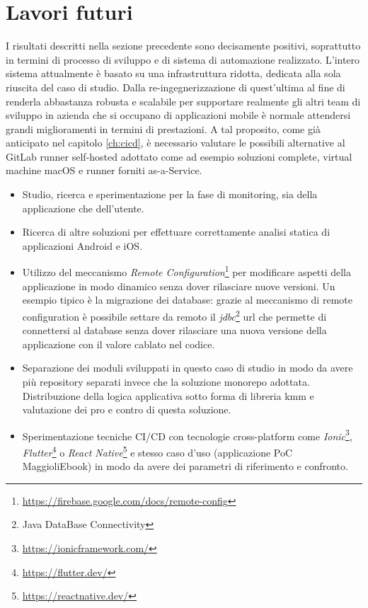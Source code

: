 \section{Lavori futuri}
I risultati descritti nella sezione precedente sono decisamente positivi, soprattutto in termini di processo di sviluppo e di sistema di automazione realizzato. L'intero sistema attualmente è basato su una infrastruttura ridotta, dedicata alla sola riuscita del caso di studio. Dalla re-ingegnerizzazione di quest'ultima al fine di renderla abbastanza robusta e scalabile per supportare realmente gli altri team di sviluppo in azienda che si occupano di applicazioni mobile è normale attendersi grandi miglioramenti in termini di prestazioni. A tal proposito, come già anticipato nel capitolo \ref{ch:cicd}, è necessario valutare le possibili alternative al GitLab runner self-hosted adottato come ad esempio soluzioni complete, virtual machine macOS e runner forniti as-a-Service.



\begin{itemize}
        \item Studio, ricerca e sperimentazione per la fase di monitoring, sia della applicazione che dell'utente.
        \item Ricerca di altre soluzioni per effettuare correttamente analisi statica di applicazioni Android e iOS.
        \item Utilizzo del meccanismo \textit{Remote Configuration}\footnote{\url{https://firebase.google.com/docs/remote-config}} per modificare aspetti della applicazione in modo dinamico senza dover rilasciare nuove versioni. Un esempio tipico è la migrazione dei database: grazie al meccanismo di remote configuration è possibile settare da remoto il \textit{jdbc}\footnote{Java DataBase Connectivity} url che permette di connettersi al database senza dover rilasciare una nuova versione della applicazione con il valore cablato nel codice.
        \item Separazione dei moduli sviluppati in questo caso di studio in modo da avere più repository separati invece che la soluzione monorepo adottata. Distribuzione della logica applicativa sotto forma di libreria kmm e valutazione dei pro e contro di questa soluzione.
        \item Sperimentazione tecniche CI/CD con tecnologie cross-platform come \textit{Ionic}\footnote{\url{https://ionicframework.com/}}, \textit{Flutter}\footnote{\url{https://flutter.dev/}} o \textit{React Native}\footnote{\url{https://reactnative.dev/}} e stesso caso d'uso (applicazione PoC MaggioliEbook) in modo da avere dei parametri di riferimento e confronto.
\end{itemize}